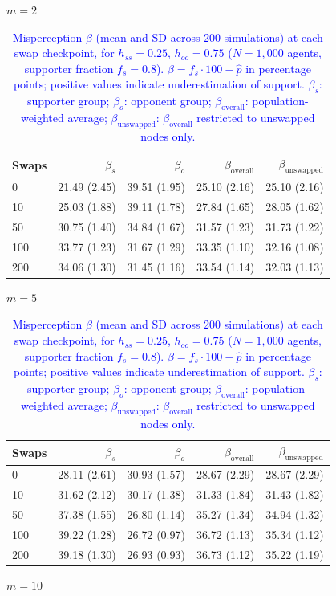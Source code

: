 \begin{table}[H]
\centering
\caption{\textcolor{blue}{Misperception $\beta$ (mean and SD across 200 simulations) at each swap checkpoint, for $h_{ss} = 0.25$, $h_{oo} = 0.75$ ($N = 1{,}000$ agents, supporter fraction $f_s = 0.8$). $\beta = f_s \cdot 100 - \hat{p}$ in percentage points; positive values indicate underestimation of support. $\beta_s$: supporter group; $\beta_o$: opponent group; $\beta_{\mathrm{overall}}$: population-weighted average; $\beta_{\mathrm{unswapped}}$: $\beta_{\mathrm{overall}}$ restricted to unswapped nodes only.}}
\label{tab:subset_fs08_hss250_hoo750}
\par\medskip
\noindent\textit{$m = 2$}\\[2pt]
\begin{tabular}{l rrrr}
\toprule
Swaps & $\beta_s$ & $\beta_o$ & $\beta_{\mathrm{overall}}$ & $\beta_{\mathrm{unswapped}}$ \\
\midrule
0 & 21.49 (2.45) & 39.51 (1.95) & 25.10 (2.16) & 25.10 (2.16) \\
10 & 25.03 (1.88) & 39.11 (1.78) & 27.84 (1.65) & 28.05 (1.62) \\
50 & 30.75 (1.40) & 34.84 (1.67) & 31.57 (1.23) & 31.73 (1.22) \\
100 & 33.77 (1.23) & 31.67 (1.29) & 33.35 (1.10) & 32.16 (1.08) \\
200 & 34.06 (1.30) & 31.45 (1.16) & 33.54 (1.14) & 32.03 (1.13) \\
\bottomrule
\end{tabular}
\par\medskip
\noindent\textit{$m = 5$}\\[2pt]
\begin{tabular}{l rrrr}
\toprule
Swaps & $\beta_s$ & $\beta_o$ & $\beta_{\mathrm{overall}}$ & $\beta_{\mathrm{unswapped}}$ \\
\midrule
0 & 28.11 (2.61) & 30.93 (1.57) & 28.67 (2.29) & 28.67 (2.29) \\
10 & 31.62 (2.12) & 30.17 (1.38) & 31.33 (1.84) & 31.43 (1.82) \\
50 & 37.38 (1.55) & 26.80 (1.14) & 35.27 (1.34) & 34.94 (1.32) \\
100 & 39.22 (1.28) & 26.72 (0.97) & 36.72 (1.13) & 35.34 (1.12) \\
200 & 39.18 (1.30) & 26.93 (0.93) & 36.73 (1.12) & 35.22 (1.19) \\
\bottomrule
\end{tabular}
\par\medskip
\noindent\textit{$m = 10$}\\[2pt]

\end{table}
